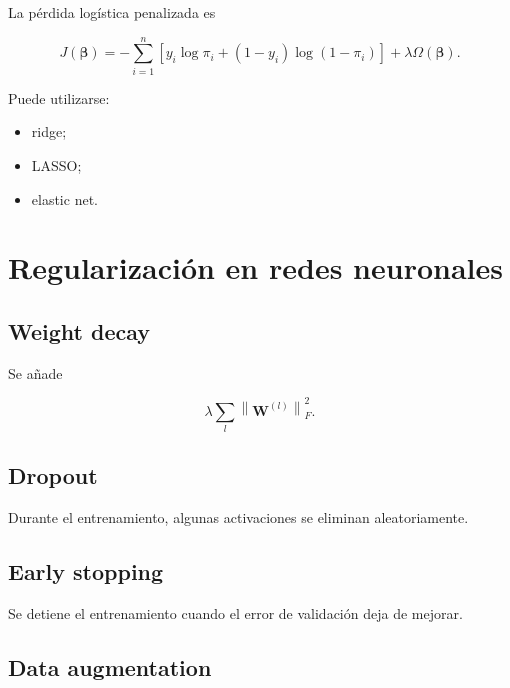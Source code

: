 \documentclass[
  spanish,
  10.5pt,
  letterpaper,
  DIV=11,
  numbers=noendperiod,
  oneside,
  open=any]{scrreprt}
\providecommand{\tightlist}{%
  \setlength{\itemsep}{0pt}\setlength{\parskip}{0pt}}
\theoremstyle{definition}
\theoremstyle{definition}
\theoremstyle{plain}
\theoremstyle{remark}
\begin{document}

La pérdida logística penalizada es

\[
J(\boldsymbol{\beta})
=
-
\sum_{i=1}^{n}
\left[
y_i\log\pi_i
+
(1-y_i)\log(1-\pi_i)
\right]
+
\lambda
\Omega(\boldsymbol{\beta}).
\]

Puede utilizarse:

\begin{itemize}
\tightlist
\item
  ridge;
\item
  LASSO;
\item
  elastic net.
\end{itemize}

\section*{Regularización en redes
neuronales}\label{regularizaciuxf3n-en-redes-neuronales}


\subsection*{Weight decay}\label{weight-decay}

Se añade

\[
\lambda
\sum_l
\left\|
\mathbf{W}^{(l)}
\right\|_F^2.
\]

\subsection*{Dropout}\label{dropout}

Durante el entrenamiento, algunas activaciones se eliminan
aleatoriamente.

\subsection*{Early stopping}\label{early-stopping}

Se detiene el entrenamiento cuando el error de validación deja de
mejorar.

\subsection*{Data augmentation}\label{data-augmentation}
\end{document}
